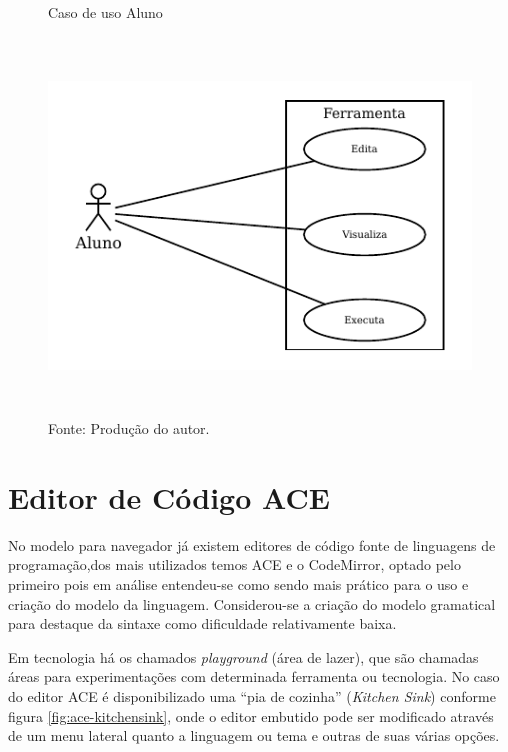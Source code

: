 \begin{figure}[h]
  \caption{\ifdraft{\color{green}}{}Caso de uso Aluno}\label{fig:usecase}
  \centering
\includegraphics[width=.8\textwidth,height=10cm,keepaspectratio]{figures/caso-de-uso.pdf}
  \caption*{\ifdraft{\color{green}}{}\footnotesize Fonte: Produção do autor.}
\end{figure}

\section{Editor de Código ACE}

No modelo para navegador já existem editores de código fonte de linguagens de programação,dos mais utilizados temos ACE\nocite{ace} e o CodeMirror\nocite{codemirror}, optado pelo primeiro pois em análise entendeu-se como sendo mais prático para o uso e criação do modelo da linguagem. Considerou-se a criação do modelo gramatical para destaque da sintaxe como dificuldade relativamente baixa.

Em tecnologia há os chamados \textit{playground} (área de lazer), que são chamadas áreas para experimentações com determinada ferramenta ou tecnologia. No caso do editor ACE é disponibilizado uma ``pia de cozinha'' (\textit{Kitchen Sink}\nocite{kitchensink}) conforme figura \ref{fig:ace-kitchensink}, onde o editor embutido pode ser modificado através de um menu lateral quanto a linguagem ou tema e outras de suas várias opções.

